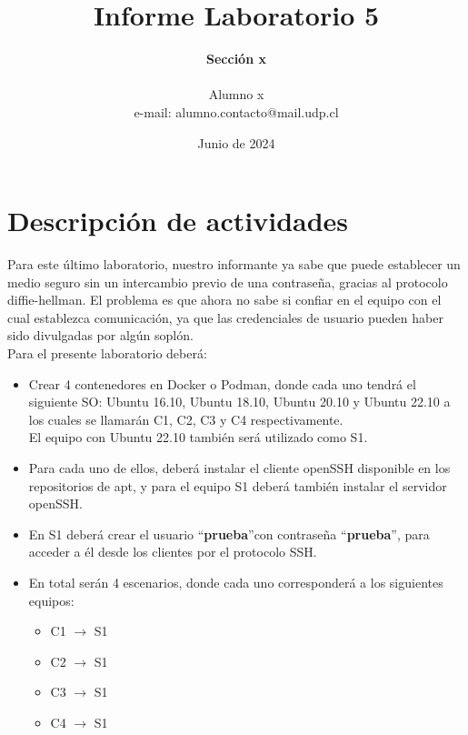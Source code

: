 \documentclass[letter,12pt]{article}
\begin{document}
%
   \title{\Huge{Informe Laboratorio 5}}

   \author{\textbf{Sección x} \\  \\Alumno x \\ e-mail: alumno.contacto@mail.udp.cl}
          
   \date{Junio de 2024}

   \maketitle

   \newpage
   
   \tableofcontents
 
  \newpage
  

\section*{Descripción de actividades}
Para este último laboratorio, nuestro informante ya sabe que puede establecer un medio seguro sin un intercambio previo de una contraseña, gracias al protocolo diffie-hellman. El problema es que ahora no sabe si confiar en el equipo con el cual establezca comunicación, ya que las credenciales de usuario pueden haber sido divulgadas por algún soplón.\\

Para el presente laboratorio deberá:

\begin{itemize}
    \item Crear 4 contenedores en Docker o Podman, donde cada uno tendrá el siguiente SO:
        Ubuntu 16.10, Ubuntu 18.10, Ubuntu 20.10 y Ubuntu 22.10 a los cuales se llamarán C1, C2, C3 y C4 respectivamente.\\
        El equipo con Ubuntu 22.10 también será utilizado como S1.
        
    \item  Para cada uno de ellos, deberá instalar el cliente openSSH disponible en los repositorios de apt, y para el equipo S1 deberá también instalar el servidor openSSH.

    \item En S1 deberá crear el usuario \textquotedblleft\textbf{prueba}\textquotedblright con contraseña \textquotedblleft\textbf{prueba}\textquotedblright, para acceder a él desde los clientes por el protocolo SSH.
    
    \item En total serán 4 escenarios, donde cada uno corresponderá a los siguientes equipos:
    \begin{itemize}
        \item C1 $\rightarrow$ S1
        \item C2 $\rightarrow$ S1
        \item C3 $\rightarrow$ S1
        \item C4 $\rightarrow$ S1
    \end{itemize}
\end{itemize}
\end{document}
